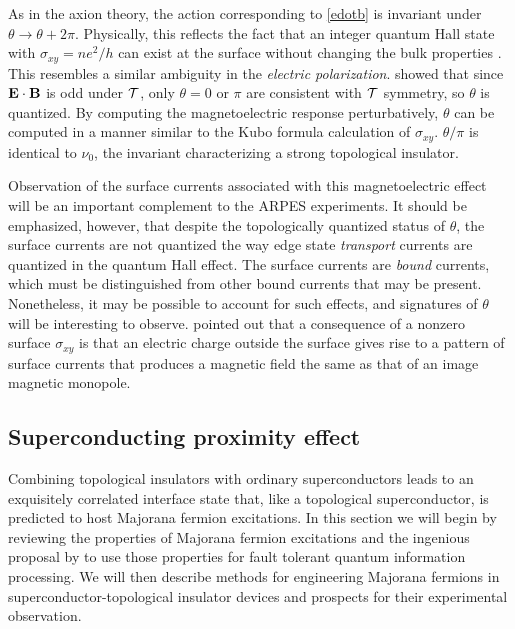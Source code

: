 \documentclass[twocolumn,floatfix,showpacs,rmp,aps]{revtex4}
\begin{document}
As in the axion theory, the action corresponding to \eqref{edotb} is invariant under
$\theta \rightarrow \theta+2\pi$.  Physically, this reflects the fact
that an integer quantum Hall state with $\sigma_{xy}=ne^2/h$
can exist at the surface without changing the bulk properties \cite{essin09}.
This resembles a similar ambiguity in the
{\it electric polarization}.
\textcite{qihugheszhang08} showed that
since ${\bf E}\cdot{\bf B}$ is odd under ${\cal T}$,
only $\theta=0$ or $\pi$ are consistent with ${\cal T}$ symmetry,
so $\theta$ is quantized.
By computing the magnetoelectric response perturbatively,
$\theta$ can be computed in a
manner similar to the Kubo formula calculation of $\sigma_{xy}$.
$\theta/\pi$ is identical to $\nu_0$, the invariant
characterizing a strong topological insulator.

Observation of the surface currents associated with this magnetoelectric effect
will be an important complement to the ARPES experiments.  It should be
emphasized, however, that despite the topologically quantized status of
$\theta$, the surface currents are not quantized the way edge state {\it transport} currents
are quantized in the quantum Hall effect.  The
surface currents are {\it bound} currents, which must be distinguished from
other bound currents that may be present.  Nonetheless, it may be possible to
account for such effects, and signatures of $\theta$
will be interesting to observe.  \textcite{qizhang09} pointed out that a
consequence of a nonzero surface $\sigma_{xy}$ is that an electric
charge outside the surface gives rise to a pattern of surface
currents that produces a magnetic field the same as that of an image
magnetic monopole.

\subsection{Superconducting proximity effect}
\label{sec:proximity}

Combining topological insulators with ordinary superconductors leads
to an exquisitely correlated interface state that, like a topological
superconductor, is predicted to host Majorana fermion excitations.
In this section we will begin by reviewing the properties of Majorana
fermion excitations and the ingenious proposal by \textcite{kitaev03} to use those
properties for fault tolerant quantum information processing.  We
will then describe methods for engineering Majorana fermions in
superconductor-topological insulator devices and prospects for their
experimental observation.
\end{document}
